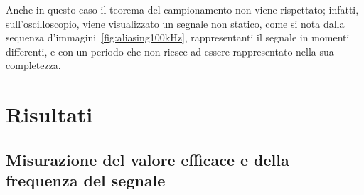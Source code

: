 \documentclass[a4paper]{article}
\begin{document}
				\newpage
				Anche in questo caso il teorema del campionamento non viene rispettato; infatti, sull’oscilloscopio, viene visualizzato un segnale non statico, come si nota dalla sequenza d'immagini~\ref{fig:aliasing100kHz}, rappresentanti il segnale in momenti differenti, e con un periodo che non riesce ad essere rappresentato nella sua completezza.
	\section{Risultati}
		\subsection{Misurazione del valore efficace e della frequenza del segnale}
\end{document}
